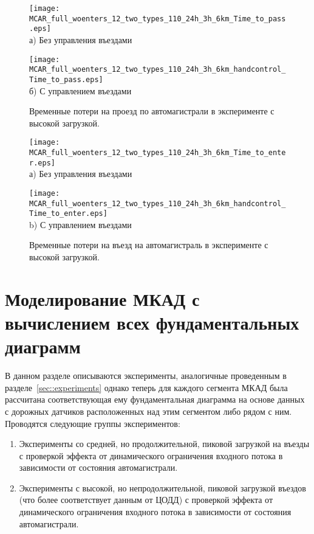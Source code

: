 \begin{figure}[ht]
    \begin{minipage}[b][][b]{.49\textwidth}
        \centering
        \texttt{[image: MCAR\_full\_woenters\_12\_two\_types\_110\_24h\_3h\_6km\_Time\_to\_pass.eps]} \\ а) Без управления въездами
    \end{minipage}
    \hfill
    \begin{minipage}[b][][b]{.49\textwidth}
        \centering
        \texttt{[image: MCAR\_full\_woenters\_12\_two\_types\_110\_24h\_3h\_6km\_handcontrol\_Time\_to\_pass.eps]} \\ б) С управлением въездами
    \end{minipage}

    \caption{Временные потери на проезд по автомагистрали в эксперименте с высокой загрузкой.}
    \label{fig:MCAR_timeloss_hight_3h_6km}
\end{figure}

\begin{figure}[ht]
    \begin{minipage}[b][][b]{.49\textwidth}
        \centering
        \texttt{[image: MCAR\_full\_woenters\_12\_two\_types\_110\_24h\_3h\_6km\_Time\_to\_enter.eps]}  \\ а) Без управления въездами
    \end{minipage}
    \hfill
    \begin{minipage}[b][][b]{.49\textwidth}
        \centering
        \texttt{[image: MCAR\_full\_woenters\_12\_two\_types\_110\_24h\_3h\_6km\_handcontrol\_Time\_to\_enter.eps]}  \\ b) С управлением въездами
    \end{minipage}

    \caption{Временные потери на въезд на автомагистраль в эксперименте с высокой загрузкой.}
    \label{fig:MCAR_timeloss_enter_hight_3h_6km}
\end{figure}



\chapter{Моделирование МКАД с вычислением всех фундаментальных диаграмм}\label{sec:ch6}
В данном разделе описываются эксперименты, аналогичные проведенным в разделе~\ref{sec::experiments} однако теперь для каждого сегмента МКАД была рассчитана соответствующая ему фундаментальная диаграмма на основе данных с дорожных датчиков
расположенных над этим сегментом либо рядом с ним.
Проводятся следующие группы экспериментов:
\begin{enumerate}
  \item Эксперименты со средней, но продолжительной, пиковой загрузкой на въезды с проверкой эффекта от динамического ограничения входного потока в зависимости от состояния автомагистрали.
  \item Эксперименты с высокой, но непродолжительной, пиковой загрузкой въездов (что более соответствует данным от ЦОДД) с проверкой эффекта от динамического ограничения входного потока в зависимости от состояния автомагистрали.
\end{enumerate}


